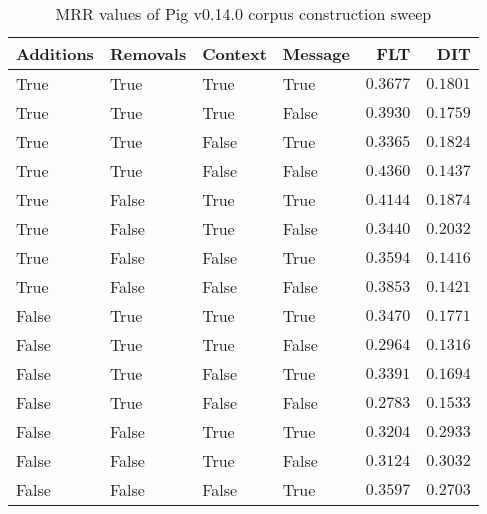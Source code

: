 
\begin{table}
\begin{spacing}{1.2}
\centering
\caption{MRR values of Pig v0.14.0 corpus construction sweep}
\label{table:pig_corpus_sweep}
\vspace{0.2em}
\begin{tabular}{llll|rr}
\toprule
Additions & Removals & Context & Message & FLT &        DIT \\
\midrule
     True &     True &    True &    True &         $0.3677$ &      $0.1801$ \\
     True &     True &    True &   False &         $0.3930$ &      $0.1759$ \\
     True &     True &   False &    True &         $0.3365$ &      $0.1824$ \\
     True &     True &   False &   False &    $\bm{0.4360}$ &      $0.1437$ \\
     True &    False &    True &    True &         $0.4144$ &      $0.1874$ \\
     True &    False &    True &   False &         $0.3440$ &      $0.2032$ \\
     True &    False &   False &    True &         $0.3594$ &      $0.1416$ \\
     True &    False &   False &   False &         $0.3853$ &      $0.1421$ \\
    False &     True &    True &    True &         $0.3470$ &      $0.1771$ \\
    False &     True &    True &   False &         $0.2964$ &      $0.1316$ \\
    False &     True &   False &    True &         $0.3391$ &      $0.1694$ \\
    False &     True &   False &   False &         $0.2783$ &      $0.1533$ \\
    False &    False &    True &    True &         $0.3204$ &      $0.2933$ \\
    False &    False &    True &   False &         $0.3124$ & $\bm{0.3032}$ \\
    False &    False &   False &    True &         $0.3597$ &      $0.2703$ \\
\bottomrule
\end{tabular}

\end{spacing}
\end{table}
